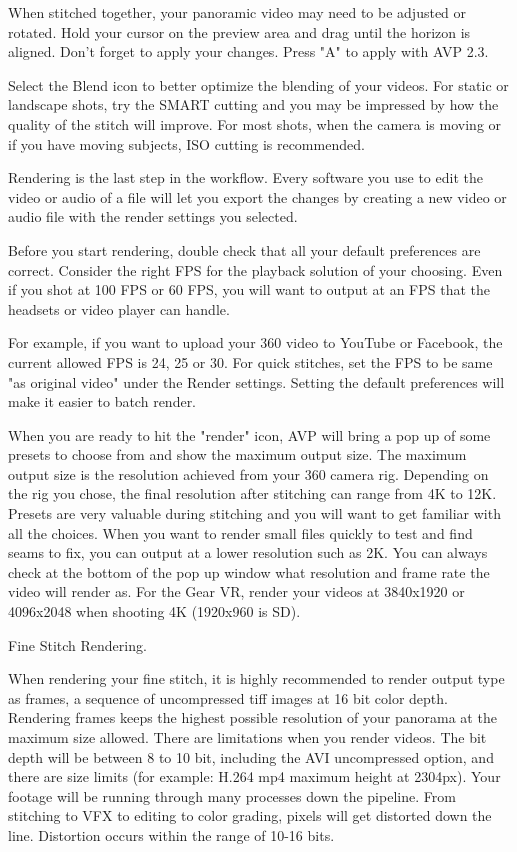 \begin{fullwidth}
When stitched together, your panoramic video may need to be adjusted or rotated. Hold your cursor on the preview area and drag until the horizon is aligned. Don't forget to apply your changes. Press "A" to apply with AVP 2.3.


Select the Blend icon to better optimize the blending of your videos. For static or landscape shots, try the SMART cutting and you may be impressed by how the quality of the stitch will improve. For most shots, when the camera is moving or if you have moving subjects, ISO cutting is recommended.

Rendering is the last step in the workflow. Every software you use to edit the video or audio of a file will let you export the changes by creating a new video or audio file with the render settings you selected.

Before you start rendering, double check that all your default preferences are correct. Consider the right FPS for the playback solution of your choosing. Even if you shot at 100 FPS or 60 FPS, you will want to output at an FPS that the headsets or video player can handle. 

For example, if you want to upload your 360 video to YouTube or Facebook, the current allowed FPS is 24, 25 or 30. For quick stitches, set the FPS to be same "as original video" under the Render settings. Setting the default preferences will make it easier to batch render.


When you are ready to hit the "render" icon, AVP will bring a pop up of some presets to choose from and show the maximum output size. The maximum output size is the resolution achieved from your 360 camera rig. Depending on the rig you chose, the final resolution after stitching can range from 4K to 12K. Presets are very valuable during stitching and you will want to get familiar with all the choices. When you want to render small files quickly to test and find seams to fix, you can output at a lower resolution such as 2K. You can always check at the bottom of the pop up window what resolution and frame rate the video will render as. For the Gear VR, render your videos at 3840x1920 or 4096x2048 when shooting 4K (1920x960 is SD).

{\large Fine Stitch Rendering. \par}

When rendering your fine stitch, it is highly recommended to render output type as frames, a sequence of uncompressed tiff images at 16 bit color depth. Rendering frames keeps the highest possible resolution of your panorama at the maximum size allowed. There are limitations when you render videos. The bit depth will be between 8 to 10 bit, including the AVI uncompressed option, and there are size limits (for example: H.264 mp4 maximum height at 2304px). Your footage will be running through many processes down the pipeline. From stitching to VFX to editing to color grading, pixels will get distorted down the line. Distortion occurs within the range of 10-16 bits. 


\end{fullwidth}
